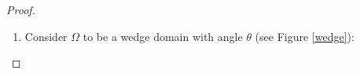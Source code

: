 \begin{proof}
\begin{enumerate}

    \item Consider \(\Omega\) to be a wedge domain with angle \(\theta\) (see Figure \ref{wedge}):
    
    \begin{figure}[H]
    \centering
\end{figure}
\end{enumerate}
\end{proof}
